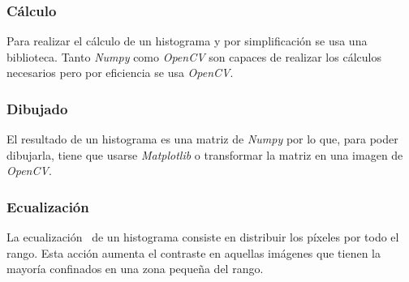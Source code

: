\subsubsection{Cálculo}
Para realizar el cálculo de un histograma y por simplificación se usa
una biblioteca. Tanto \emph{Numpy} como \emph{OpenCV} son capaces de
realizar los cálculos necesarios pero por eficiencia se usa
\emph{OpenCV}.

\subsubsection{Dibujado}
El resultado de un histograma es una matriz de \emph{Numpy} por lo
que, para poder dibujarla, tiene que usarse \emph{Matplotlib} o
transformar la matriz en una imagen de \emph{OpenCV}.

\subsubsection{Ecualización}
La ecualización~\citep*[3.1.4 Histogram
equalization]{szeliski2010computer} de un histograma consiste en
distribuir los píxeles por todo el rango. Esta acción aumenta el
contraste en aquellas imágenes que tienen la mayoría confinados en una
zona pequeña del rango.

